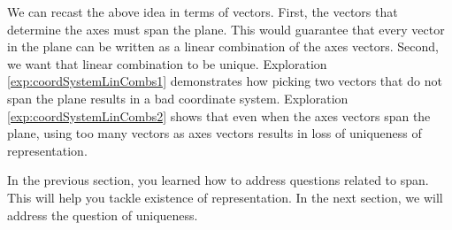 \documentclass{ximera}
\begin{document}
We can recast the above idea in terms of vectors.  First, the vectors that determine the axes must span the plane.  This would guarantee that every vector in the plane can be written as a linear combination of the axes vectors.  Second, we want that linear combination to be unique.  Exploration \ref{exp:coordSystemLinCombs1} demonstrates how picking two vectors that do not span the plane results in a bad coordinate system.  Exploration \ref{exp:coordSystemLinCombs2} shows that even when the axes vectors span the plane, using too many vectors as axes vectors results in loss of uniqueness of representation.
  
In the previous section, you learned how to address questions related to span. This will help you tackle existence of representation.  In the next section, we will address the question of uniqueness.
\end{document}
